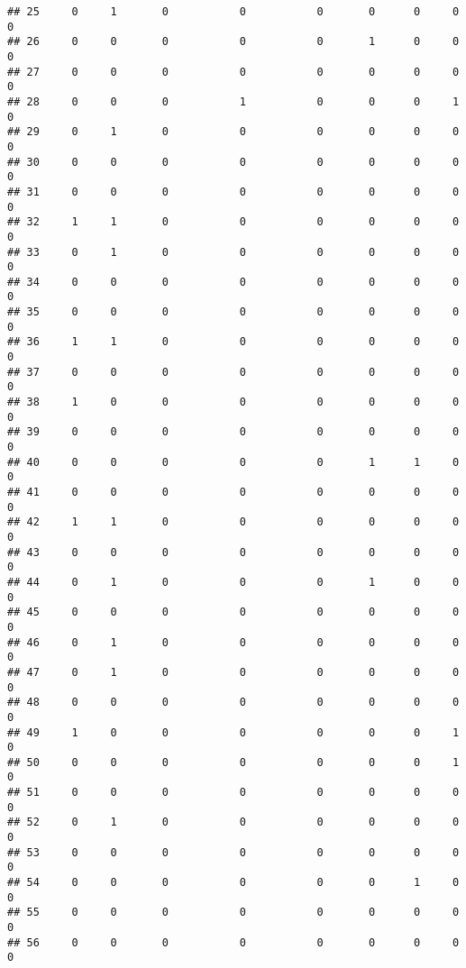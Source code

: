 \documentclass[
]{article}
\begin{document}
\begin{verbatim}
## 25     0     1       0           0           0       0      0     0          0
## 26     0     0       0           0           0       1      0     0          0
## 27     0     0       0           0           0       0      0     0          0
## 28     0     0       0           1           0       0      0     1          0
## 29     0     1       0           0           0       0      0     0          0
## 30     0     0       0           0           0       0      0     0          0
## 31     0     0       0           0           0       0      0     0          0
## 32     1     1       0           0           0       0      0     0          0
## 33     0     1       0           0           0       0      0     0          0
## 34     0     0       0           0           0       0      0     0          0
## 35     0     0       0           0           0       0      0     0          0
## 36     1     1       0           0           0       0      0     0          0
## 37     0     0       0           0           0       0      0     0          0
## 38     1     0       0           0           0       0      0     0          0
## 39     0     0       0           0           0       0      0     0          0
## 40     0     0       0           0           0       1      1     0          0
## 41     0     0       0           0           0       0      0     0          0
## 42     1     1       0           0           0       0      0     0          0
## 43     0     0       0           0           0       0      0     0          0
## 44     0     1       0           0           0       1      0     0          0
## 45     0     0       0           0           0       0      0     0          0
## 46     0     1       0           0           0       0      0     0          0
## 47     0     1       0           0           0       0      0     0          0
## 48     0     0       0           0           0       0      0     0          0
## 49     1     0       0           0           0       0      0     1          0
## 50     0     0       0           0           0       0      0     1          0
## 51     0     0       0           0           0       0      0     0          0
## 52     0     1       0           0           0       0      0     0          0
## 53     0     0       0           0           0       0      0     0          0
## 54     0     0       0           0           0       0      1     0          0
## 55     0     0       0           0           0       0      0     0          0
## 56     0     0       0           0           0       0      0     0          0

\end{verbatim}
\end{document}
